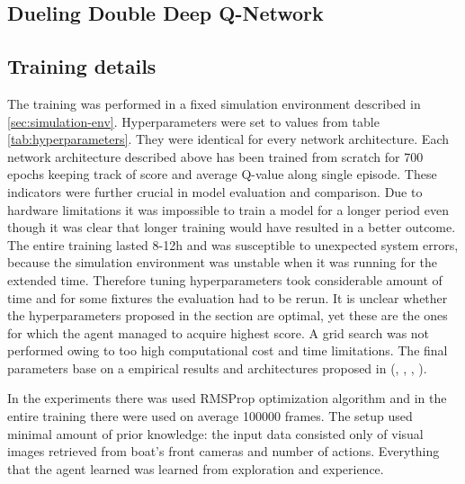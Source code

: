 \subsection{Dueling Double Deep Q-Network}
\label{sub:dueling-double-deep-q-network}

\subsection{Training details}
\label{sub:training-details}

The training was performed in a fixed simulation environment described in \ref{sec:simulation-env}. Hyperparameters were set to values from table \ref{tab:hyperparameters}. They were identical for every network architecture. Each network architecture described above has been trained from scratch for 700 epochs keeping track of score and average Q-value along single episode. These indicators were further crucial in model evaluation and comparison. Due to hardware limitations it was impossible to train a model for a longer period even though it was clear that longer training would have resulted in a better outcome. The entire training lasted 8-12h and was susceptible to unexpected system errors, because the simulation environment was unstable when it was running for the extended time. Therefore tuning hyperparameters took considerable amount of time and for some fixtures the evaluation had to be rerun. It is unclear whether the hyperparameters proposed in the section are optimal, yet these are the ones for which the agent managed to acquire highest score. A grid search was not performed owing to too high computational cost and time limitations. The final parameters base on a empirical results and architectures proposed in (\cite{DQNAtari}, \cite{2020DuckieTown}, \cite{DBLP:journals/corr/HasseltGS15}, \cite{DBLP:journals/corr/WangFL15}).

In the experiments there was used RMSProp optimization algorithm and in the entire training there were used on average 100000 frames. The setup used minimal amount of prior knowledge: the input data consisted only of visual images retrieved from boat's front cameras and number of actions. Everything that the agent learned was learned from exploration and experience.